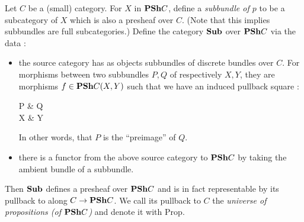 \documentclass{article}
\begin{document}
\begin{prop}

  Let $C$ be a (small) category.
  For $X$ in $\mathbf{PSh} C$,
  define a \emph{subbundle of $p$} to be a subcategory of $X$
  which is also a presheaf over $C$.
  (Note that this implies subbundles are full subcategories.)
  Define the category $\mathbf{Sub}$ over $\mathbf{PSh} C$ via the data :
  \begin{itemize}
    \item the source category has as objects 
    subbundles of discrete bundles over $ C$.
    For morphisms between two subbundles $P, Q$ of 
    respectively $X, Y$,
    they are morphisms $f \in \mathbf{PSh} C(X,Y)$ such that
    we have an induced pullback square : 
    \begin{cd}
      P & Q \\
      X & Y
      \arrow[from=2-1, to=2-2, "f"{swap}]
      \arrow[from=1-1, to=2-1]
      \arrow[from=1-1, to=1-2]
      \arrow[from=1-2, to=2-2]
      \arrow["\lrcorner"{anchor=center, pos=0.125}, draw=none, from=1-1, to=2-2]
    \end{cd}
    In other words, that $P$ is the ``preimage'' of $Q$.
    \item there is a functor from the above source category to $\mathbf{PSh} C$
    by taking the ambient bundle of a subbundle.
  \end{itemize} 
  Then $\mathbf{Sub}$ defines a presheaf over $\mathbf{PSh} C$ and is in fact
  representable by its pullback to along $ C \to \mathbf{PSh} C$.
  We call its pullback to $C$ the 
  \emph{universe of propositions (of $\mathbf{PSh} C$)}
  and denote it with $\mathrm{Prop}$.
\end{prop}
\end{document}
